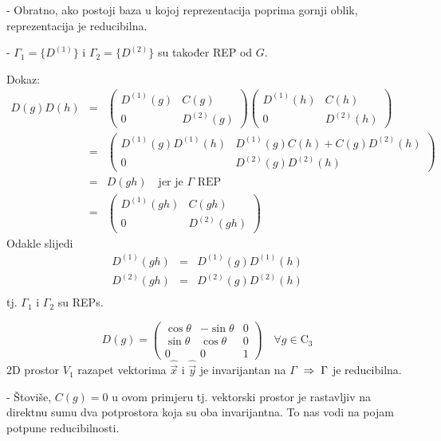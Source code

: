- Obratno, ako postoji baza u kojoj reprezentacija poprima
gornji oblik, reprezentacija je reducibilna.

- $\Gamma_1=\{D^{(1)}\}$ i $\Gamma_2=\{D^{(2)}\}$ su također REP
 od $G$.

Dokaz:
\begin{eqnarray*}
D(g)D(h)&=&\left(
\begin{array}{cc}
 D^{(1)}(g) & C(g) \\ 0 & D^{(2)}(g)
\end{array}\right)
\left(
\begin{array}{cc}
 D^{(1)}(h) & C(h) \\ 0 & D^{(2)}(h)
\end{array}\right)  \\
&=& \left(
\begin{array}{cc}
  D^{(1)}(g)D^{(1)}(h) &  D^{(1)}(g)C(h)+C(g)D^{(2)}(h) \\
       0               &   D^{(2)}(g)D^{(2)}(h)  
\end{array} \right) \\
&=& D(gh) \quad \textrm{jer je $\Gamma$ REP}  \\
&=& \left(
\begin{array}{cc}
 D^{(1)}(gh) & C(gh) \\ 0 & D^{(2)}(gh)
\end{array}\right)  
\end{eqnarray*}
Odakle slijedi
\begin{eqnarray*}
D^{(1)}(gh) &=& D^{(1)}(g)D^{(1)}(h) \\
D^{(2)}(gh) &=& D^{(2)}(g)D^{(2)}(h) \\
\end{eqnarray*}
tj. $\Gamma_1$ i $\Gamma_2$ su REPs.

\begin{primjer}

\begin{displaymath}
 D(g)= \left( 
\begin{array}{ccc}
 \cos\theta & -\sin\theta & 0 \\
 \sin\theta& \cos\theta & 0 \\
    0 & 0 & 1 
\end{array}
\right) \quad \forall g \in \textrm{C}_3
\end{displaymath}
2D prostor $V_1$ razapet vektorima $\hat{\vec{x}}$ i $\hat{\vec{y}}$
je invarijantan na $\Gamma$ $\;\Rightarrow\; \Gamma$ je reducibilna.

- Štoviše, $C(g)=0$ u ovom primjeru tj. vektorski prostor je
  rastavljiv na direktnu sumu dva potprostora koja su oba
invarijantna. To nas vodi na pojam potpune reducibilnosti.
\end{primjer}

